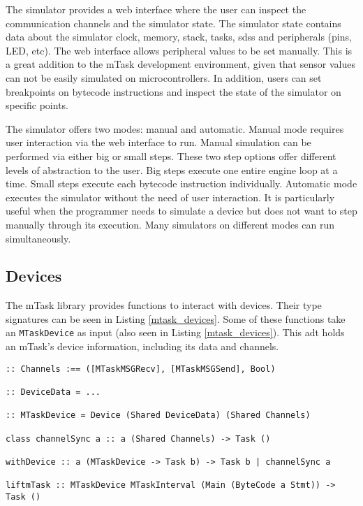 The simulator provides a web interface where the user can inspect the communication channels and the simulator state. The simulator state contains data about the simulator clock, memory, stack, tasks, \acp{sds} and peripherals (pins, LED, etc). The web interface allows peripheral values to be set manually. This is a great addition to the \gls{mTask} development environment, given that sensor values can not be easily simulated on microcontrollers. In addition, users can set breakpoints on bytecode instructions and inspect the state of the simulator on specific points.

The simulator offers two modes: manual and automatic. Manual mode requires user interaction via the web interface to run. Manual simulation can be performed via either big or small steps. These two step options offer different levels of abstraction to the user. Big steps execute one entire engine loop at a time. Small steps execute each bytecode instruction individually. Automatic mode executes the simulator without the need of user interaction. It is particularly useful when the programmer needs to simulate a device but does not want to step manually through its execution. Many simulators on different modes can run simultaneously.

\subsection{Devices}\label{sec:mtask_devices}

The \gls{mTask} library provides functions to interact with devices. Their type signatures can be seen in Listing \ref{mtask_devices}. Some of these functions take an \texttt{MTaskDevice} as input (also seen in Listing \ref{mtask_devices}). This \acs{adt} holds an \gls{mTask}'s device information, including its data and channels. 

\begin{lstlisting}[caption=Device interaction functions,captionpos=b,label=mtask_devices]
:: Channels :== ([MTaskMSGRecv], [MTaskMSGSend], Bool)

:: DeviceData = ...

:: MTaskDevice = Device (Shared DeviceData) (Shared Channels)

class channelSync a :: a (Shared Channels) -> Task ()

withDevice :: a (MTaskDevice -> Task b) -> Task b | channelSync a

liftmTask :: MTaskDevice MTaskInterval (Main (ByteCode a Stmt)) -> Task () 
\end{lstlisting}

